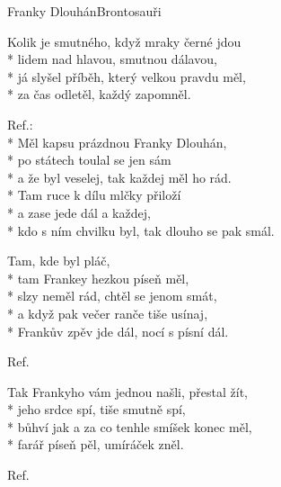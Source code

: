 \documentclass[10.5pt]{book}
\begin{document}
\begin{poem}{Franky Dlouhán}{Brontosauři}

\settowidth{\versewidth}{kdo s ním chvilku byl, tak dlouho se pak smál.}

Kolik je smutného, když mraky černé jdou\\*
lidem nad hlavou, smutnou dálavou,\\*
já slyšel příběh, který velkou pravdu měl,\\*
za čas odletěl, každý zapomněl.

Ref.:\\*
Měl kapsu prázdnou Franky Dlouhán,\\*
po státech toulal se jen sám\\*
a že byl veselej, tak každej měl ho rád.\\*
Tam ruce k dílu mlčky přiloží\\*
a zase jede dál a každej,\\*
kdo s ním chvilku byl, tak dlouho se pak smál.

Tam, kde byl pláč,\\*
tam Frankey hezkou píseň měl,\\*
slzy neměl rád, chtěl se jenom smát,\\*
a když pak večer ranče tiše usínaj,\\*
Frankův zpěv jde dál, nocí s písní dál.

Ref.

Tak Frankyho vám jednou našli, přestal žít,\\*
jeho srdce spí, tiše smutně spí,\\*
bůhví jak a za co tenhle smíšek konec měl,\\*
farář píseň pěl, umíráček zněl.

Ref.

\end{poem}
\end{document}
